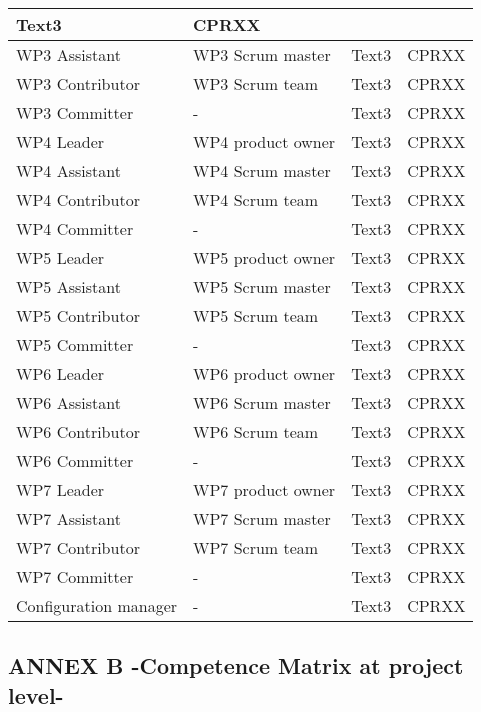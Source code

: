 \documentclass{template/openetcs_article}
\begin{document}
\begin{flushleft}
\begin{supertabular}{|m{2cm}|m{2cm}|m{9cm}|m{2cm}|}
Text3 &
CPRXX\\\hline
WP3 Assistant &
WP3 Scrum master &
Text3 &
CPRXX\\\hline
WP3 Contributor &
WP3 Scrum team  &
Text3 &
CPRXX\\\hline
WP3 Committer &
- &
Text3 &
CPRXX\\\hline
WP4 Leader &
WP4 product owner &
Text3 &
CPRXX\\\hline
WP4 Assistant &
WP4 Scrum master &
Text3 &
CPRXX\\\hline
WP4 Contributor &
WP4 Scrum team  &
Text3 &
CPRXX\\\hline
WP4 Committer &
- &
Text3 &
CPRXX\\\hline
WP5 Leader &
WP5 product owner &
Text3 &
CPRXX\\\hline
WP5 Assistant &
WP5 Scrum master &
Text3 &
CPRXX\\\hline
WP5 Contributor &
WP5 Scrum team  &
Text3 &
CPRXX\\\hline
WP5 Committer &
- &
Text3 &
CPRXX\\\hline
WP6 Leader &
WP6 product owner &
Text3 &
CPRXX\\\hline
WP6 Assistant &
WP6 Scrum master &
Text3 &
CPRXX\\\hline
WP6 Contributor &
WP6 Scrum team  &
Text3 &
CPRXX\\\hline
WP6 Committer &
- &
Text3 &
CPRXX\\\hline
WP7 Leader &
WP7 product owner &
Text3 &
CPRXX\\\hline
WP7 Assistant &
WP7 Scrum master &
Text3 &
CPRXX\\\hline
WP7 Contributor &
WP7 Scrum team  &
Text3 &
CPRXX\\\hline
WP7 Committer &
- &
Text3 &
CPRXX\\\hline
Configuration manager &
- &
Text3 &
CPRXX\\\hline

\end{supertabular}
\end{flushleft}



\subsection{ANNEX B -Competence Matrix at project level-}
\end{document}
